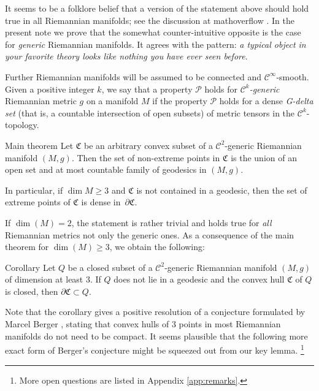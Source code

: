 \documentclass[a4paper,10pt]{article}
\begin{document}
It seems to be a folklore belief that a version of the statement above should hold true in all Riemannian manifolds;
see the discussion at mathoverflow \cite{petrunin-2009}.
In the present note we prove that the somewhat counter-intuitive opposite is the case for \emph{generic} Riemannian manifolds.
It agrees with the pattern: \emph{a typical object in your favorite theory looks like nothing you have ever seen before}.

Further Riemannian manifolds will be assumed to be connected and $\mathcal C^\infty$-smooth.
Given a positive integer $k$, we say that a property $\mathcal P$ holds for \emph{$\mathcal C^k$-generic} Riemannian metric $g$ on a manifold $M$ 
if the property $\mathcal P$ holds for a dense \emph{G-delta set} (that is, a countable intersection of open subsets) of metric tensors in the $\mathcal C^k$-topology.

\begin{thm}{Main theorem}\label{thm:main}
Let $\mathfrak C$ be an arbitrary convex subset of a $\mathcal C^2$-generic Riemannian manifold $(M,g)$.
Then the set of non-extreme points in $\mathfrak C$ is the union of an open set and at most countable family of geodesics in $(M,g)$. 

In particular, if $\dim M\ge 3$ and $\mathfrak C$ is not contained in a geodesic, then the set of
extreme points of $\mathfrak{C}$ is dense in~$\partial\mathfrak{C}$.
\end{thm}



If $\dim (M) =2$, the statement is rather trivial and holds true for \emph{all} Riemannian metrics not only the generic ones.
As a consequence  of the main theorem for $\dim (M) \geq 3$, we obtain the following:

\begin{thm}{Corollary}\label{cor:caratheodory}
Let $Q$ be a closed subset of a $\mathcal C^2$-generic Riemannian manifold $(M,g)$ of dimension at least $3$. If $Q$ does not lie in a  geodesic and
the convex hull $\mathfrak C$ of $Q$ is closed, then $\partial \mathfrak C \subset Q$.
\end{thm}

Note that the corollary gives a positive resolution of a conjecture formulated by Marcel Berger
\cite[Note 6.1.3.1]{berger-2003}, stating that convex hulls of $3$ points in most Riemannian manifolds do not need to be  compact.
It seems plausible that  the following more exact form of Berger's conjecture might be squeezed out from our key lemma.%
\footnote{More open questions are listed in  Appendix \ref{app:remarks}.}
\end{document}
